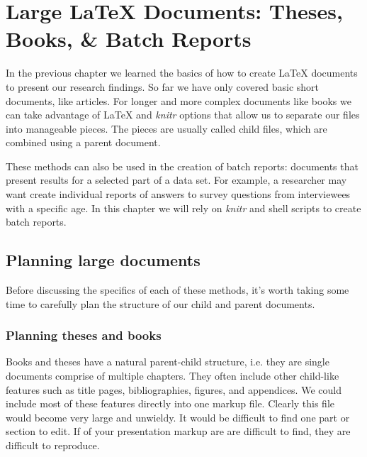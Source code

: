 



\chapter{Large LaTeX Documents: Theses, Books, \& Batch Reports}\label{LargeDocs}

In the previous chapter we learned the basics of how to create LaTeX documents to present our research findings. So far we have only covered basic short documents, like articles. For longer and more complex documents like books we can take advantage of LaTeX and {\emph{knitr}} options that allow us to separate our files into manageable pieces. The pieces are usually called child files, which are combined using a parent document.

These methods can also be used in the creation of batch reports: documents that present results for a selected part of a data set. For example, a researcher may want create individual reports of answers to survey questions from interviewees with a specific age. In this chapter we will rely on {\emph{knitr}} and shell scripts to create batch reports. 

\section{Planning large documents}

Before discussing the specifics of each of these methods, it's worth taking some time to carefully plan the structure of our child and parent documents.

\subsection{Planning theses and books}

Books and theses have a natural parent-child structure, i.e. they are single documents comprise of multiple chapters. They often include other child-like features such as title pages, bibliographies, figures, and appendices. We could include most of these features directly into one markup file. Clearly this file would become very large and unwieldy. It would be difficult to find one part or section to edit. If of your presentation markup are are difficult to find, they are difficult to reproduce.  

